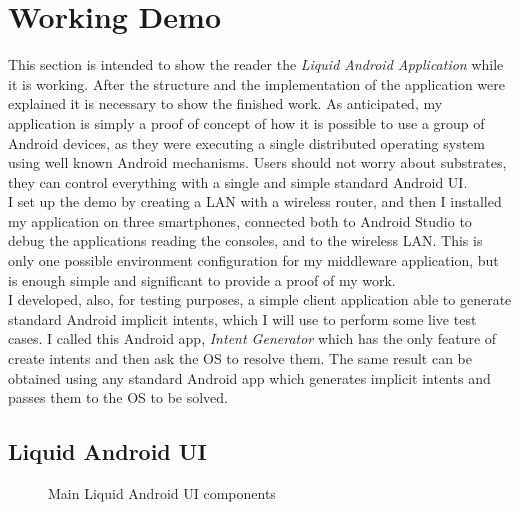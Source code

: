 \section{Working Demo}
This section is intended to show the reader the \textit{Liquid Android Application} while it is working. After the structure and the implementation of the application were explained it is necessary to show the finished work. As anticipated, my application
is simply a proof of concept of how it is possible to use a group of Android devices, as they were executing a single distributed operating system using well known  Android mechanisms. Users should not worry about substrates, they can control everything with a single and simple standard Android UI.\\
I set up the demo by creating a LAN with a wireless router, and then I installed my application on three smartphones, connected both to Android Studio to debug the applications reading the consoles, and to the wireless LAN. This is only one possible environment configuration for my middleware application, but is enough simple and significant to provide a proof of my work.\\
I developed, also, for testing purposes, a simple client application able to generate standard Android implicit intents, which I will use to perform some live test cases. I called this Android app, \textit{Intent Generator} which has the only feature of create intents and then ask the OS to resolve them. The same result can be obtained using any standard Android app which generates implicit intents and passes them to the OS to be solved.
\subsection{Liquid Android UI}
\begin{figure}[h]
	\centering
	\begin{minipage}{.49\textwidth}\centering
	\end{minipage}
	\begin{minipage}{.49\textwidth}\centering
	\end{minipage}
	\caption{Main Liquid Android UI components}
	\label{fig:5.2}
\end{figure}

